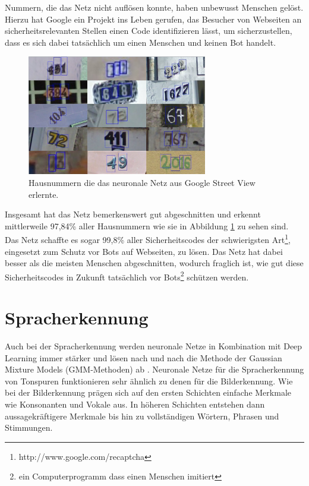 Nummern, die das Netz nicht auflösen konnte, haben unbewusst Menschen gelöst. Hierzu hat Google ein Projekt ins Leben gerufen, das Besucher von Webseiten an sicherheitsrelevanten Stellen einen Code identifizieren lässt, um sicherzustellen, dass es sich dabei tatsächlich um einen Menschen und keinen Bot handelt.

\begin{figure}
	\centering
	\includegraphics[width=0.7\textwidth]{images/streetview-numbers.png}
	\caption{Hausnummern die das neuronale Netz aus Google Street View erlernte.}
	\label{fig:streetview-numbers}
\end{figure}

Insgesamt hat das Netz bemerkenswert gut abgeschnitten \citep{numbercharts} und erkennt mittlerweile 97,84\% aller Hausnummern wie sie in Abbildung \ref{fig:streetview-numbers} zu sehen sind. Das Netz schaffte es sogar 99,8\% aller Sicherheitscodes der schwierigsten Art\footnote{http://www.google.com/recaptcha}, eingesetzt zum Schutz vor Bots auf Webseiten, zu lösen. Das Netz hat dabei besser als die meisten Menschen abgeschnitten, wodurch fraglich ist, wie gut diese Sicherheitscodes in Zukunft tatsächlich vor Bots\footnote{ein Computerprogramm dass einen Menschen imitiert} schützen werden.

\section{Spracherkennung}

Auch bei der Spracherkennung werden neuronale Netze in Kombination mit Deep Learning immer stärker und lösen nach und nach die Methode der Gaussian Mixture Models (GMM-Methoden) ab \citep{GaussVsNeural}. Neuronale Netze für die Spracherkennung von Tonspuren funktionieren sehr ähnlich zu denen für die Bilderkennung. Wie bei der Bilderkennung prägen sich auf den ersten Schichten einfache Merkmale wie Konsonanten und Vokale aus. In höheren Schichten entstehen dann aussagekräftigere Merkmale bis hin zu vollständigen Wörtern, Phrasen und Stimmungen. 

